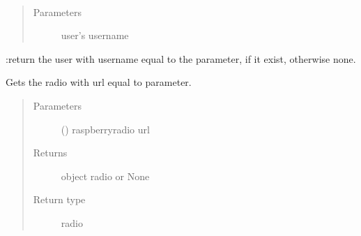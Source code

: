 \documentclass[letterpaper,10pt,english]{sphinxmanual}
\begin{document}

\begin{fulllineitems}
\label{\detokenize{index:controller.utility.get_user}}~\begin{quote}\begin{description}
\item[{Parameters}] \leavevmode
{} \textendash{} user’s username

\end{description}\end{quote}

:return the user with username equal to the parameter, if it exist, otherwise none.

\end{fulllineitems}


\begin{fulllineitems}
\label{\detokenize{index:controller.utility.radio_from_url}}
Gets the radio with url equal to parameter.
\begin{quote}\begin{description}
\item[{Parameters}] \leavevmode
{} () \textendash{} raspberry\sphinxhyphen{}radio url

\item[{Returns}] \leavevmode
object radio or None

\item[{Return type}] \leavevmode
radio

\end{description}\end{quote}

\end{fulllineitems}

\end{document}
